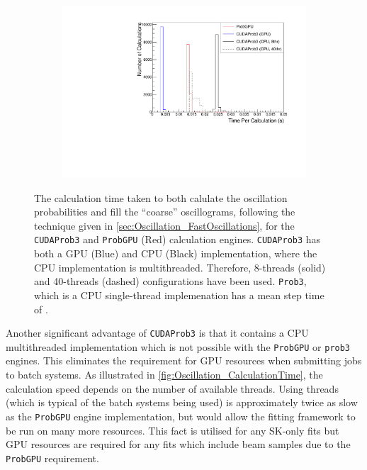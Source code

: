 \begin{figure}[h]
  \begin{subfigure}[t]{0.8\textwidth}
    \includegraphics[width=\textwidth, trim={0mm 0mm 0mm 0mm}, clip,page=1]{Figures/Oscillation/CalculationTime.pdf}
  \end{subfigure}
  \caption{The calculation time taken to both calulate the oscillation probabilities and fill the ``coarse'' oscillograms, following the technique given in \autoref{sec:Oscillation_FastOscillations},  for the \texttt{CUDAProb3} and \texttt{ProbGPU} (Red) calculation engines. \texttt{CUDAProb3} has both a GPU (Blue) and CPU (Black) implementation, where the CPU implementation is multithreaded. Therefore, 8-threads (solid) and 40-threads (dashed) configurations have been used. \texttt{Prob3}, which is a CPU single-thread implemenation has a mean step time of .}
  \label{fig:Oscillation_CalculationTime}
\end{figure}

Another significant advantage of \texttt{CUDAProb3} is that it contains a CPU multithreaded implementation which is not possible with the \texttt{ProbGPU} or \texttt{prob3} engines. This eliminates the requirement for GPU resources when submitting jobs to batch systems. As illustrated in \autoref{fig:Oscillation_CalculationTime}, the calculation speed depends on the number of available threads. Using  threads (which is typical of the batch systems being used) is approximately twice as slow as the \texttt{ProbGPU} engine implementation, but would allow the fitting framework to be run on many more resources. This fact is utilised for any SK-only fits but GPU resources are required for any fits which include beam samples due to the \texttt{ProbGPU} requirement.


